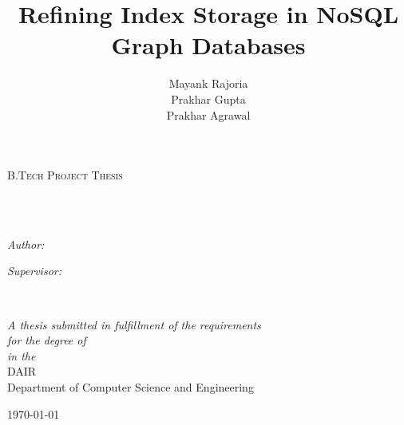 \documentclass[
11pt, %
oneside, %
english, %
singlespacing, %
toctotoc, %
headsepline, %
]{MastersDoctoralThesis} %
\title{Refining Index Storage in NoSQL Graph Databases}
\author{Mayank Rajoria \\Prakhar Gupta \\Prakhar Agrawal } %
\begin{document}
\frontmatter %

\pagestyle{plain} %


\begin{titlepage}
\begin{center}

\vspace*{.06\textheight}
{\scshape\LARGE \univname\par}\vspace{1.5cm} %
\textsc{\Large B.Tech Project Thesis}\\[0.5cm] %

\HRule \\[0.4cm] %
{\huge \bfseries \ttitle\par}\vspace{0.4cm} %
\HRule \\[1.5cm] %
 
\begin{minipage}[t]{0.4\textwidth}
\begin{flushleft} \large
\emph{Author:}\\
\href{}{\authorname} %
\end{flushleft}
\end{minipage}
\begin{minipage}[t]{0.4\textwidth}
\begin{flushright} \large
\emph{Supervisor:} \\
\href{}{\supname} %
\end{flushright}
\end{minipage}\\[3cm]
 
\vfill

\large \textit{A thesis submitted in fulfillment of the requirements\\ for the degree of \degreename}\\[0.3cm] %
\textit{in the}\\[0.4cm]
DAIR\\Department of Computer Science and Engineering\\[2cm] %
 
\vfill

{\large \today}\\[4cm] %
 
\vfill
\end{center}
\end{titlepage}
\end{document}
